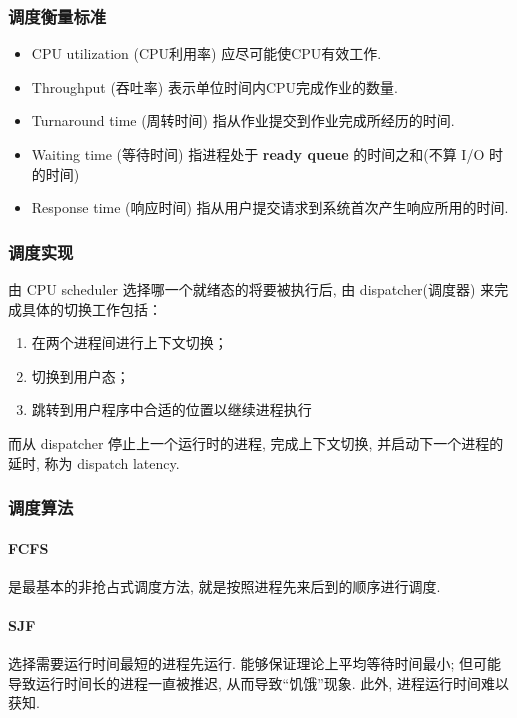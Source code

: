 \subsubsection{调度衡量标准}
\begin{itemize}\small
    \item CPU utilization (CPU利用率) 
    \subitem 应尽可能使CPU有效工作. 
    \item Throughput (吞吐率)
    \subitem 表示单位时间内CPU完成作业的数量. 
    \item Turnaround time (周转时间)
    \subitem 指从作业提交到作业完成所经历的时间. 
    \item Waiting time (等待时间)
    \subitem 指进程处于 \textbf{ready queue} 的时间之和(不算 I/O 时 的时间)
    \item Response time (响应时间)
    \subitem 指从用户提交请求到系统首次产生响应所用的时间.
\end{itemize}

\subsubsection{调度实现}
由 CPU scheduler 选择哪一个就绪态的将要被执行后, 由 dispatcher(调度器) 来完成具体的切换工作包括：
\begin{enumerate}
    \item 在两个进程间进行上下文切换；
    \item 切换到用户态；
    \item 跳转到用户程序中合适的位置以继续进程执行
\end{enumerate}
而从 dispatcher 停止上一个运行时的进程, 完成上下文切换, 并启动下一个进程的延时, 称为 dispatch latency. 

\subsubsection{调度算法}

\paragraph{FCFS} 是最基本的非抢占式调度方法, 就是按照进程先来后到的顺序进行调度. 

\paragraph{SJF}选择需要运行时间最短的进程先运行. 能够保证理论上平均等待时间最小; 但可能导致运行时间长的进程一直被推迟, 从而导致“饥饿”现象. 此外, 进程运行时间难以获知. 

